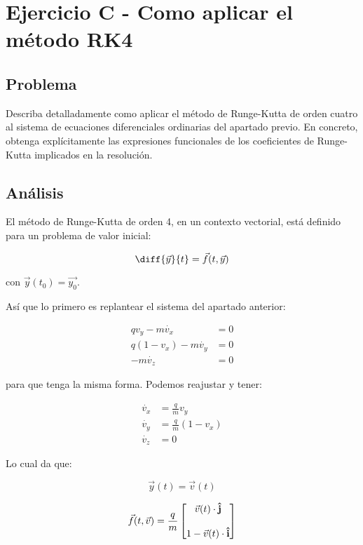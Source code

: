 \section{Ejercicio C - Como aplicar el método RK4}

\subsection{Problema}

Describa detalladamente como aplicar el método de Runge-Kutta de orden cuatro al sistema de ecuaciones diferenciales ordinarias del apartado previo. En concreto, obtenga explícitamente las expresiones funcionales de los coeficientes de Runge-Kutta implicados en la resolución.

\subsection{Análisis}

El método de Runge-Kutta de orden 4, en un contexto vectorial, está definido para un problema de valor inicial:

$$
\diff{\vec{y}}{t} = \vec{f}(t, \vec{y})
$$

con $\vec{y}(t_0) = \vec{y_0}$. 

Así que lo primero es replantear el sistema del apartado anterior: 


\begin{align*}
	q v_y - m \dot{v_x} &= 0 \\
	q(1 - v_x) - m \dot{v_y} &= 0 \\
	-m \dot{v_z} &= 0
\end{align*}

para que tenga la misma forma. Podemos reajustar y tener:

\begin{align*}
	\dot{v_x} &= \frac{q}{m} v_y \\
	\dot{v_y} &= \frac{q}{m}(1 - v_x) \\
	\dot{v_z} &= 0
\end{align*}

Lo cual da que:

$$
\vec{y}(t) = \vec{v}(t)
$$

$$
\vec{f}(t, \vec{v}) = \frac{q}{m} \begin{bmatrix}
\vec{v}(t) \cdot \boldsymbol{\hat{\textbf{j}}} \\ \\
1-\vec{v}(t) \cdot \boldsymbol{\hat{\textbf{i}}}\end{bmatrix}
$$

